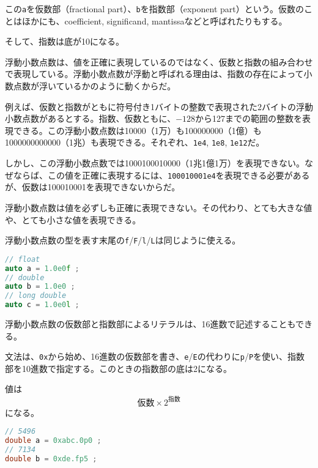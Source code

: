 この\texttt{a}を仮数部（fractional part）、\texttt{b}を指数部（exponent part）という。仮数のことはほかにも、coefficient, significand, mantissaなどと呼ばれたりもする。

そして、指数は底が10になる。

浮動小数点数は、値を正確に表現しているのではなく、仮数と指数の組み合わせで表現している。浮動小数点数が浮動と呼ばれる理由は、指数の存在によって小数点数が浮いているかのように動くからだ。

例えば、仮数と指数がともに符号付き1バイトの整数で表現された2バイトの浮動小数点数があるとする。指数、仮数ともに、\(-128\)から127までの範囲の整数を表現できる。この浮動小数点数は10000（1万）も100000000（1億）も1000000000000（1兆）も表現できる。それぞれ、\texttt{1e4}, \texttt{1e8}, \texttt{1e12}だ。

しかし、この浮動小数点数では1000100010000（1兆1億1万）を表現できない。なぜならば、この値を正確に表現するには、\texttt{100010001e4}を表現できる必要があるが、仮数は100010001を表現できないからだ。

浮動小数点数は値を必ずしも正確に表現できない。その代わり、とても大きな値や、とても小さな値を表現できる。

浮動小数点数の型を表す末尾の\texttt{f}/\texttt{F}/\texttt{l}/\texttt{L}は同じように使える。

\begin{lstlisting}[language={C++}]
// float
auto a = 1.0e0f ;
// double
auto b = 1.0e0 ;
// long double
auto c = 1.0e0l ;
\end{lstlisting}


浮動小数点数の仮数部と指数部によるリテラルは、16進数で記述することもできる。

文法は、\texttt{0x}から始め、16進数の仮数部を書き、\texttt{e}/\texttt{E}の代わりに\texttt{p}/\texttt{P}を使い、指数部を10進数で指定する。このときの指数部の底は2になる。

値は
\[仮数 \times 2^{指数}\]
になる。

\begin{lstlisting}[language={C++}]
// 5496
double a = 0xabc.0p0 ;
// 7134
double b = 0xde.fp5 ;
\end{lstlisting}


